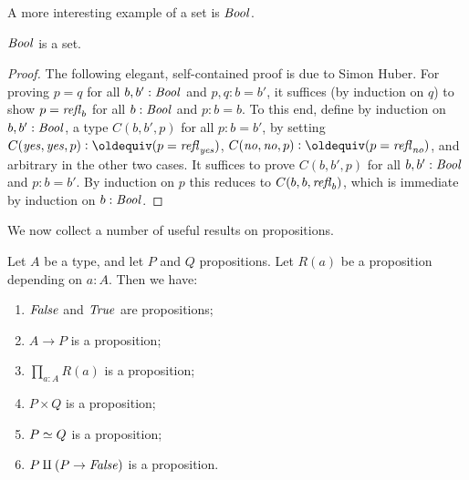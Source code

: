 A more interesting example of a set is $\mathop{\mathit{Bool}}$.

\begin{lemma}\label{lem:isset-bool}
$\mathop{\mathit{Bool}}$ is a set.
\end{lemma}
\begin{proof}
The following elegant, self-contained proof is due to Simon Huber.
For proving $p=q$ for all $b,b':\mathop{\mathit{Bool}}$ and $p,q: b=b'$,
it suffices (by induction on $q$) to show
$p=\mathop{{\it refl}_{b}}$ for all $b:\mathop{\mathit{Bool}}$ and $p: b=b$.
To this end, define by induction on $b,b':\mathop{\mathit{Bool}}$,
a type $C(b,b',p)$ for all $p: b=b'$, by setting
$C(\yes,\yes,p)\defeq (p=\refl{\yes})$,
$C(\no,\no,p)\defeq (p=\refl{\no})$,
and arbitrary in the other two cases.
It suffices to prove $C(b,b',p)$ for all $b,b':\mathop{\mathit{Bool}}$
and $p: b=b'$. By induction on $p$ this reduces to
$C(b,b,\mathop{{\it refl}_{b}})$, which is immediate by induction on $b:\mathop{\mathit{Bool}}$.
\end{proof}

We now collect a number of useful results on propositions.

\begin{lemma}\label{lem:prop-utils}
Let $A$ be a type, and let $P$ and $Q$ propositions.
Let $R(a)$ be a proposition depending on $a:A$. Then we have:
\begin{enumerate}
\item\label{prop-utils-false-true} $\mathop{\mathit{False}}$ and $\mathop{\mathit{True}}$ are propositions;
\item\label{prop-utils-implication} $A\to P$ is a proposition;
\item\label{prop-utils-pi} $\prod_{a:A} R(a)$ is a proposition;
\item\label{prop-utils-times} $P\times Q$ is a proposition;
\item\label{prop-utils-eq} $P \simeq Q$ is a proposition;
\item\label{prop-utils-lem} $P \amalg (P\to\mathop{\mathit{False}})$ is a proposition.
\end{enumerate}
\end{lemma}

